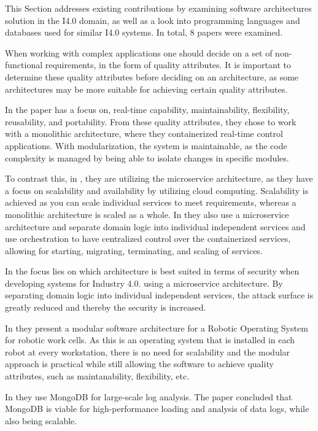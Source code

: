 
This Section addresses existing contributions by examining software architectures solution in the I4.0 domain, as well as a look into programming languages and databases used for similar I4.0 systems. 
In total, 8 papers were examined.

When working with complex applications one should decide on a set of non-functional requirements, in the form of quality attributes. It is important to determine these quality attributes before deciding on an architecture, as some architectures may be more suitable for achieving certain quality attributes.\cite{8417118}

In \cite{8436369} the paper has a focus on, real-time capability, maintainability, flexibility, reusability, and portability. From these quality attributes, they chose to work with a monolithic architecture, where they containerized real-time control applications. With modularization, the system is maintainable, as the code complexity is managed by being able to isolate changes in specific modules.

To contrast this, in \cite{8387665}, they are utilizing the microservice architecture, as they have a focus on scalability and availability by utilizing cloud computing. Scalability is achieved as you can scale individual services to meet requirements, whereas a monolithic architecture is scaled as a whole.
In \cite{7915594}\cite{GOLDSCHMIDT201828} they also use a microservice architecture and separate domain logic into individual independent services and use orchestration to have centralized control over the containerized services, allowing for starting, migrating, terminating, and scaling of services.

In \cite{article} the focus lies on which architecture is best suited in terms of security when developing systems for Industry 4.0. using a microservice architecture. By separating domain logic into individual independent services, the attack surface is greatly reduced and thereby the security is increased.

In \cite{9659378} they present a modular software architecture for a Robotic Operating System for robotic work cells. As this is an operating system that is installed in each robot at every workstation, there is no need for scalability and the modular approach is practical while still allowing the software to achieve quality attributes, such as maintanability, flexibility, etc.

In \cite{10.1145/2790755.2790772} they use MongoDB for large-scale log analysis. The paper concluded that MongoDB is viable for high-performance loading and analysis of data logs, while also being scalable.

